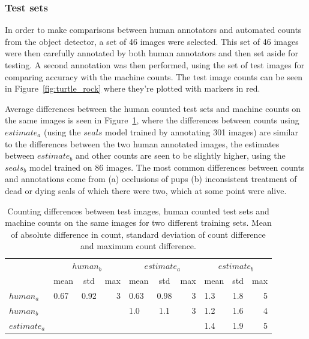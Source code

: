 \subsubsection{Test sets}

In order to make comparisons between human annotators and automated counts from the object detector, a set of 46 images were selected. This set of 46 images were then carefully annotated by both human annotators and then set aside for testing. A second annotation was then performed, using the set of test images for comparing accuracy with the machine counts. The test image counts can be seen in Figure~\ref{fig:turtle_rock} where they're plotted with markers in red. 

Average differences between the human counted test sets and machine counts on the same images is seen in Figure~\ref{tab:test_comparison}, where the differences between counts using $estimate_a$ (using the $seals$ model trained by annotating 301 images) are similar to the differences between the two human annotated images, the estimates between $estimate_b$ and other counts are seen to be slightly higher, using the $seals_b$ model trained on 86 images. The most common differences between counts and annotations come from (a) occlusions of pups (b) inconsistent treatment of dead or dying seals of which there were two, which at some point were alive.

\begin{table}[tbh!]
    \centering
\caption{Counting differences between test images, human counted test sets and machine counts on the same images for two different training sets. Mean of absolute difference in count, standard deviation of count difference and maximum count difference. }    
\label{tab:test_comparison} 
\begin{tabular}{l | lcr | lcr | lcr | }
 &  \multicolumn{3}{c|}{$human_b$} &  \multicolumn{3}{c|}{$estimate_a$} &  \multicolumn{3}{c|}{$estimate_b$} \\
 &  mean & std & max &  mean & std & max &  mean & std & max \\
\toprule
$human_a$  & 0.67 & 0.92 & 3 & 0.63 & 0.98 & 3 & 1.3 & 1.8 & 5    \\
$human_b$  &      &      &   & 1.0 & 1.1 & 3 & 1.2 & 1.6 & 4 \\
$estimate_a$ &    &      &   &     &     &   & 1.4 & 1.9 & 5  \\
\bottomrule
\end{tabular}
\end{table}

